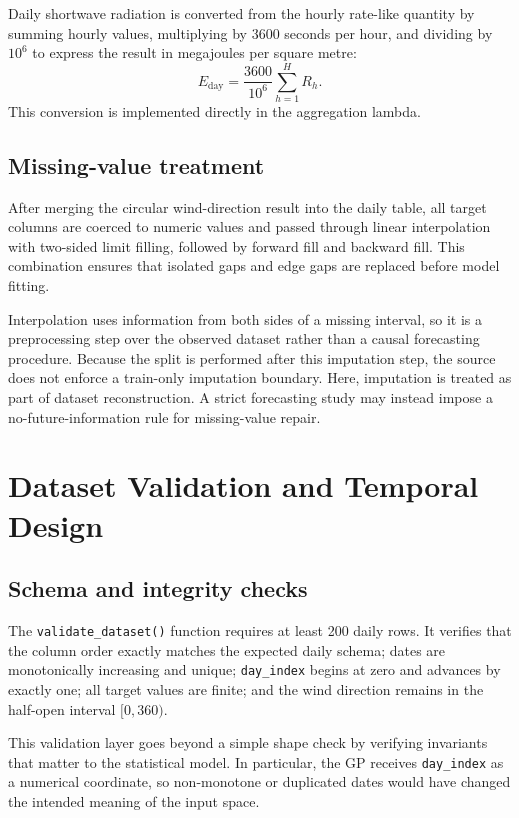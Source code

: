 \documentclass[11pt,a4paper]{article}
\newcommand{\code}[1]{\texttt{#1}}
\begin{document}
Daily shortwave radiation is converted from the hourly rate-like quantity by summing hourly values, multiplying by $3600$ seconds per hour, and dividing by $10^6$ to express the result in megajoules per square metre:
\begin{equation}
 E_{\mathrm{day}} = \frac{3600}{10^6}\sum_{h=1}^{H} R_h.
\end{equation}
This conversion is implemented directly in the aggregation lambda.

\subsection{Missing-value treatment}
After merging the circular wind-direction result into the daily table, all target columns are coerced to numeric values and passed through linear interpolation with two-sided limit filling, followed by forward fill and backward fill. This combination ensures that isolated gaps and edge gaps are replaced before model fitting.

Interpolation uses information from both sides of a missing interval, so it is a preprocessing step over the observed dataset rather than a causal forecasting procedure. Because the split is performed after this imputation step, the source does not enforce a train-only imputation boundary. Here, imputation is treated as part of dataset reconstruction. A strict forecasting study may instead impose a no-future-information rule for missing-value repair.

\section{Dataset Validation and Temporal Design}
\subsection{Schema and integrity checks}
The \code{validate\_dataset()} function requires at least 200 daily rows. It verifies that the column order exactly matches the expected daily schema; dates are monotonically increasing and unique; \code{day\_index} begins at zero and advances by exactly one; all target values are finite; and the wind direction remains in the half-open interval $[0,360)$.

This validation layer goes beyond a simple shape check by verifying invariants that matter to the statistical model. In particular, the GP receives \code{day\_index} as a numerical coordinate, so non-monotone or duplicated dates would have changed the intended meaning of the input space.
\end{document}
